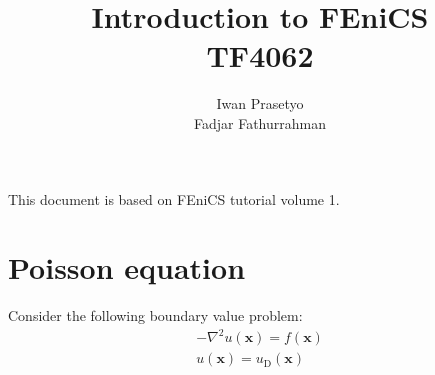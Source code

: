 \documentclass[a4paper,12pt]{article} %
\begin{document}
\title{Introduction to FEniCS \\
TF4062}
\author{Iwan Prasetyo \\
Fadjar Fathurrahman}
\date{}
\maketitle

This document is based on FEniCS tutorial volume 1.

\section{Poisson equation}

Consider the following boundary value problem:
\begin{align}
-\nabla^2 u(\mathbf{x}) = f(\mathbf{x}) \\
u(\mathbf{x}) = u_{\mathrm{D}}(\mathbf{x})
\end{align}
\end{document}

